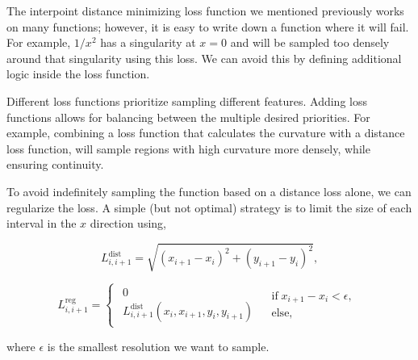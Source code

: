 

The interpoint distance minimizing loss function we mentioned previously works on many functions; however, it is easy to write down a function where it will fail.
For example, $1/x^2$ has a singularity at $x=0$ and will be sampled too densely around that singularity using this loss.
We can avoid this by defining additional logic inside the loss function.


Different loss functions prioritize sampling different features.
Adding loss functions allows for balancing between the multiple desired priorities.
For example, combining a loss function that calculates the curvature with a distance loss function, will sample regions with high curvature more densely, while ensuring continuity.


To avoid indefinitely sampling the function based on a distance loss alone, we can regularize the loss.
A simple (but not optimal) strategy is to limit the size of each interval in the $x$ direction using,

\begin{equation*}
L_{i, i+1}^\textrm{dist}=\sqrt{(x_{i+1}-x_{i})^{2}+(y_{i+1}-y_{i})^{2}},
\end{equation*}

\begin{equation*}
L_{i,i+1}^\textrm{reg}=\begin{cases}
\begin{array}{c}
0\\
L_{i, i+1}^\textrm{dist}(x_i, x_{i+1}, y_i, y_{i+1})
\end{array} & \begin{array}{c}
\textrm{if} \; x_{i+1}-x_{i}<\epsilon,\\
\textrm{else,}
\end{array}\end{cases}
\end{equation*}

where $\epsilon$ is the smallest resolution we want to sample.


